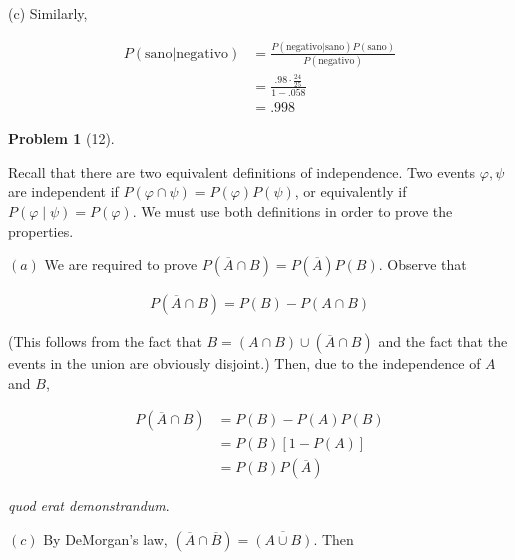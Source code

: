 \documentclass[a4paper, 12pt]{article}
\newtheorem{problem}{Problem}
\newtheorem{problem}{Problem}
\begin{document}
   (c) Similarly, 

   \begin{align*}
       P(\text{sano} | \text{negativo}) &= \frac{P(\text{negativo} | \text{sano}) P(\text{sano})}{P(\text{negativo})} \\ 
                                        &= \frac{.98 \cdot \frac{24}{25}}{1-.058} \\ 
                                        &=.998
   \end{align*}


   \pagebreak 

   \begin{problem}[12]
       
   \end{problem}

   Recall that there are two equivalent definitions of independence. Two events 
   $\varphi, \psi$ are independent if $P(\varphi \cap \psi) = P(\varphi)P(\psi)$,
   or equivalently if $P(\varphi \mid \psi) = P(\varphi)$. We must use both 
   definitions in order to prove the properties.

   $(a)$ We are required to prove $P(\overline{A} \cap B) = P(\overline{A})P(B)$. Observe that 

   \begin{align*}
       P(\overline{A} \cap B) = P(B) - P(A \cap B)
   \end{align*}

   (This follows from the fact that $B = (A \cap B) \cup (\overline{A} \cap B)$ and the fact that 
   the events in the union are obviously disjoint.) Then, due to the independence of 
   $A$ and $B$,

   \begin{align*}
       P(\overline{A} \cap B) &= P(B) - P(A)P(B)\\ 
                              &= P(B)\left[ 1 - P(A) \right]  \\ 
                              &=P(B)P( \overline{A} )
   \end{align*}

  \textit{quod erat demonstrandum}.

  $(c)$ By DeMorgan's law, $(\overline{A} \cap \overline{B}) = \overline{(A \cup B)}$. Then 
\end{document}
